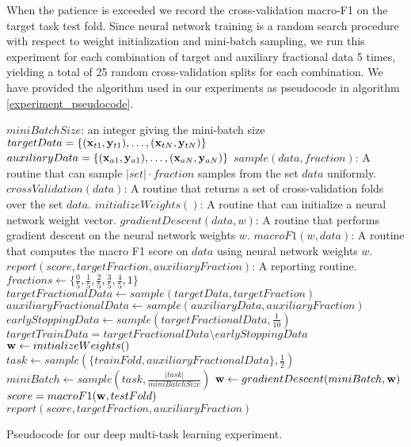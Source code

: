 When the patience is exceeded we record the cross-validation macro-F1 on the target task test fold. Since neural network training is a random search procedure with respect to weight initialization and mini-batch sampling, we run this experiment for each combination of target and auxiliary fractional data 5 times, yielding a total of 25 random cross-validation splits for each combination. We have provided the algorithm used in our experiments as pseudocode in algorithm \ref{experiment_pseudocode}.
\begin{algorithm}
\begin{algorithmic}
	\Require $miniBatchSize$: an integer giving the mini-batch size
	\Require $targetData = \{(\mathbf{x}_{t1},\mathbf{y}_{t1}),\dots,(\mathbf{x}_{tN},\mathbf{y}_{tN})\}$
	\Require $auxiliaryData = \{(\mathbf{x}_{a1},\mathbf{y}_{a1}),\dots,(\mathbf{x}_{aN},\mathbf{y}_{aN})\}$
	\Require $sample(data, fraction)$: A routine that can sample $|set| \cdot fraction$ samples from the set $data$ uniformly.
	\Require $crossValidation(data)$: A routine that returns a set of cross-validation folds over the set $data$.
	\Require $initializeWeights()$: A routine that can initialize a neural network weight vector.
	\Require $gradientDescent(data, w)$: A routine that performs gradient descent on the neural network weights $w$.
	\Require $macroF1(w, data)$: A routine that computes the macro F1 score on $data$ using neural network weights $w$.
	\Require $report(score, targetFraction, auxiliaryFraction)$: A reporting routine.
	\State $fractions \gets \{\frac{0}{5}, \frac{1}{5}, \frac{2}{5}, \frac{3}{5}, \frac{4}{5}, 1\}$
				\State $targetFractionalData \gets sample(targetData, targetFraction)$
				\State $auxiliaryFractionalData \gets sample(auxiliaryData, auxiliaryFraction)$
				\State $earlyStoppingData \gets sample(targetFractionalData, \frac{1}{10})$
				\State $targetTrainData = targetFractionalData \setminus earlyStoppingData$
					\State $\mathbf{w} \gets initializeWeights()$
						\State $task \gets sample(\{trainFold, auxiliaryFractionalData\}, \frac{1}{2})$
						\State $miniBatch \gets sample(task, \frac{|task|}{miniBatchSize})$
						\State $\mathbf{w} \gets gradientDescent(miniBatch, \mathbf{w})$
					\EndWhile
					\State $score = macroF1(\mathbf{w}, testFold)$
					\State $report(score, targetFraction, auxiliaryFraction)$
				\EndFor
			\EndFor
		\EndFor
	\EndFor
\end{algorithmic}
\caption{Pseudocode for our deep multi-task learning experiment.}\label{experiment_pseudocode}
\end{algorithm}
